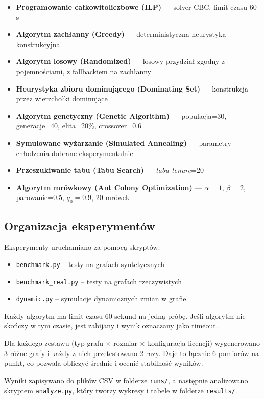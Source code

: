 \begin{itemize}
  \item \textbf{Programowanie całkowitoliczbowe (ILP)} — solver CBC, limit czasu 60 s
  \item \textbf{Algorytm zachłanny (Greedy)} — deterministyczna heurystyka konstrukcyjna
  \item \textbf{Algorytm losowy (Randomized)} — losowy przydział zgodny z pojemnościami, z fallbackiem na zachłanny
  \item \textbf{Heurystyka zbioru dominującego (Dominating Set)} — konstrukcja przez wierzchołki dominujące
  \item \textbf{Algorytm genetyczny (Genetic Algorithm)} — populacja=30, generacje=40, elita=20\%, crossover=0.6
  \item \textbf{Symulowane wyżarzanie (Simulated Annealing)} — parametry chłodzenia dobrane eksperymentalnie
  \item \textbf{Przeszukiwanie tabu (Tabu Search)} — \emph{tabu tenure}=20
  \item \textbf{Algorytm mrówkowy (Ant Colony Optimization)} — $\alpha=1$, $\beta=2$, parowanie=0.5, $q_0=0.9$, 20 mrówek
\end{itemize}

\subsection{Organizacja eksperymentów}

Eksperymenty uruchamiano za pomocą skryptów:
\begin{itemize}
  \item \texttt{benchmark.py} -- testy na grafach syntetycznych
  \item \texttt{benchmark\_real.py} -- testy na grafach rzeczywistych
  \item \texttt{dynamic.py} -- symulacje dynamicznych zmian w grafie
\end{itemize}

Każdy algorytm ma limit czasu 60 sekund na jedną próbę. Jeśli algorytm nie skończy w tym czasie, jest zabijany i wynik oznaczany jako timeout.

Dla każdego zestawu (typ grafu × rozmiar × konfiguracja licencji) wygenerowano 3 różne grafy i każdy z nich przetestowano 2 razy. Daje to łącznie 6 pomiarów na punkt, co pozwala obliczyć średnie i ocenić stabilność wyników.

Wyniki zapisywano do plików CSV w folderze \texttt{runs/}, a następnie analizowano skryptem \texttt{analyze.py}, który tworzy wykresy i tabele w folderze \texttt{results/}.

